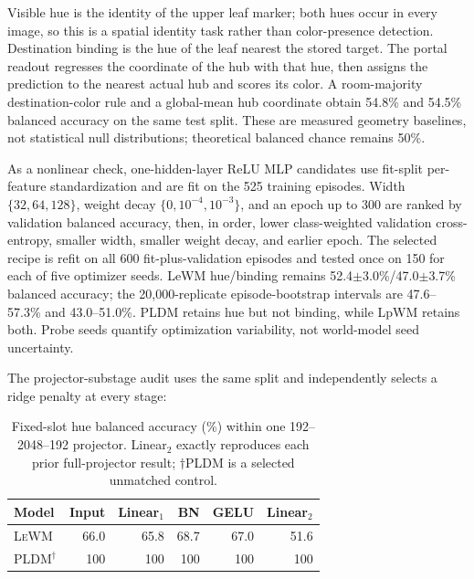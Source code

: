 \documentclass{article}
\newcommand{\lewm}{\textsc{LeWM}}
\newcommand{\pldm}{\textsc{PLDM}}
\begin{document}
Visible hue is the identity of the upper leaf marker; both hues occur in every
image, so this is a spatial identity task rather than color-presence detection.
Destination binding is the hue of the leaf nearest the stored target.  The
portal readout regresses the coordinate of the hub with that hue, then assigns
the prediction to the nearest actual hub and scores its color.  A
room-majority destination-color rule and a global-mean hub coordinate obtain
54.8\% and 54.5\% balanced accuracy on the same test split.  These are measured
geometry baselines, not statistical null distributions; theoretical balanced
chance remains 50\%.

As a nonlinear check, one-hidden-layer ReLU MLP candidates use fit-split
per-feature standardization and are fit on the 525 training episodes.  Width $\{32,64,128\}$, weight decay
$\{0,10^{-4},10^{-3}\}$, and an epoch up to 300 are ranked by validation balanced
accuracy, then, in order, lower class-weighted validation cross-entropy,
smaller width, smaller weight decay, and earlier epoch.  The selected recipe is refit on all
600 fit-plus-validation episodes and tested once on 150 for each of five
optimizer seeds.
LeWM hue/binding remains 52.4$\pm$3.0\%/47.0$\pm$3.7\% balanced accuracy; the
20,000-replicate episode-bootstrap intervals are 47.6--57.3\% and
43.0--51.0\%.  PLDM retains hue but not binding, while LpWM retains both.
Probe seeds quantify optimization variability, not world-model seed
uncertainty.

The projector-substage audit uses the same split and independently selects a
ridge penalty at every stage:

\begin{table}[h]
\centering
\small
\setlength{\tabcolsep}{3.5pt}
\begin{tabular}{@{}lrrrrr@{}}
\toprule
Model & Input & Linear$_1$ & BN & GELU & Linear$_2$ \\
\midrule
\lewm{} & 66.0 & 65.8 & 68.7 & 67.0 & 51.6 \\
\pldm{}$^\dagger$ & 100 & 100 & 100 & 100 & 100 \\
\bottomrule
\end{tabular}
\caption{Fixed-slot hue balanced accuracy (\%) within one 192--2048--192
projector.  Linear$_2$ exactly reproduces each prior full-projector result;
$\dagger$PLDM is a selected unmatched control.}
\label{tab:projector-substage}
\end{table}
\end{document}
